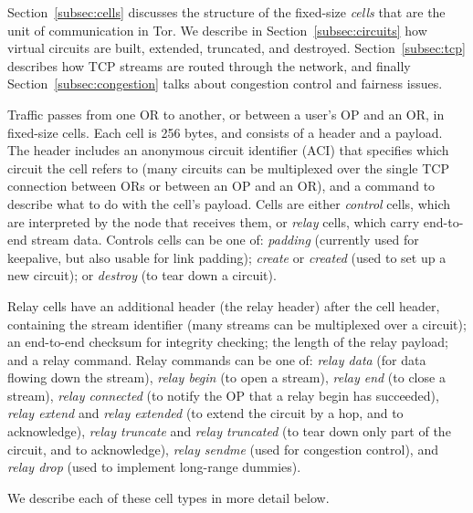 \documentclass[times,10pt,twocolumn]{article}
\begin{document}
Section~\ref{subsec:cells} discusses the structure of the fixed-size
\emph{cells} that are the unit of communication in Tor. We describe
in Section~\ref{subsec:circuits} how virtual circuits are
built, extended, truncated, and destroyed. Section~\ref{subsec:tcp}
describes how TCP streams are routed through the network, and finally
Section~\ref{subsec:congestion} talks about congestion control and
fairness issues.

\label{subsec:cells}


Traffic passes from one OR to another, or between a user's OP and an OR,
in fixed-size cells. Each cell is 256
bytes, and consists of a header and a payload. The header includes an
anonymous circuit identifier (ACI) that specifies which circuit the
cell refers to
(many circuits can be multiplexed over the single TCP connection between
ORs or between an OP and an OR), and a command to describe what to do
with the cell's payload. Cells are either \emph{control} cells, which are
interpreted by the node that receives them, or \emph{relay} cells,
which carry end-to-end stream data. Controls cells can be one of:
\emph{padding} (currently used for keepalive, but also usable for link
padding); \emph{create} or \emph{created} (used to set up a new circuit);
or \emph{destroy} (to tear down a circuit).

Relay cells have an additional header (the relay header) after the
cell header, containing the stream identifier (many streams can
be multiplexed over a circuit); an end-to-end checksum for integrity
checking; the length of the relay payload; and a relay command. Relay
commands can be one of: \emph{relay
data} (for data flowing down the stream), \emph{relay begin} (to open a
stream), \emph{relay end} (to close a stream), \emph{relay connected}
(to notify the OP that a relay begin has succeeded), \emph{relay
extend} and \emph{relay extended} (to extend the circuit by a hop,
and to acknowledge), \emph{relay truncate} and \emph{relay truncated}
(to tear down only part of the circuit, and to acknowledge), \emph{relay
sendme} (used for congestion control), and \emph{relay drop} (used to
implement long-range dummies).

We describe each of these cell types in more detail below.
\end{document}
